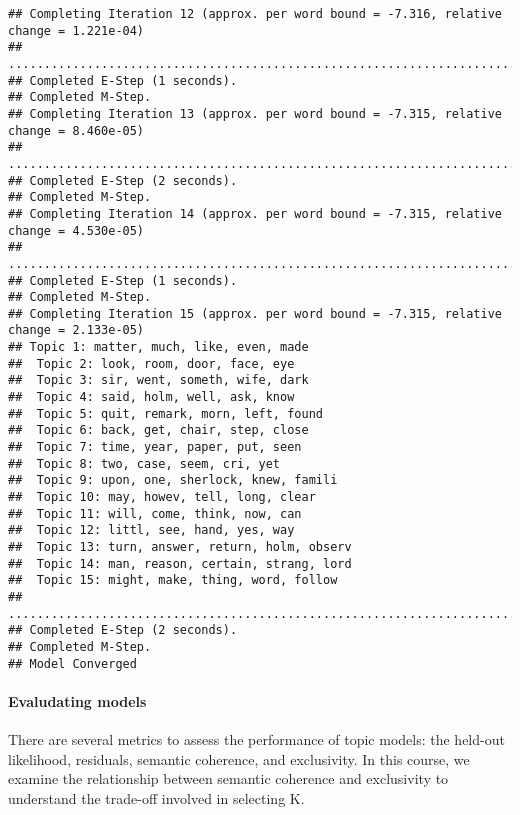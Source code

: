 \documentclass[
]{book}
\begin{document}
\begin{verbatim}
## Completing Iteration 12 (approx. per word bound = -7.316, relative change = 1.221e-04) 
## ....................................................................................................
## Completed E-Step (1 seconds). 
## Completed M-Step. 
## Completing Iteration 13 (approx. per word bound = -7.315, relative change = 8.460e-05) 
## ....................................................................................................
## Completed E-Step (2 seconds). 
## Completed M-Step. 
## Completing Iteration 14 (approx. per word bound = -7.315, relative change = 4.530e-05) 
## ....................................................................................................
## Completed E-Step (1 seconds). 
## Completed M-Step. 
## Completing Iteration 15 (approx. per word bound = -7.315, relative change = 2.133e-05) 
## Topic 1: matter, much, like, even, made 
##  Topic 2: look, room, door, face, eye 
##  Topic 3: sir, went, someth, wife, dark 
##  Topic 4: said, holm, well, ask, know 
##  Topic 5: quit, remark, morn, left, found 
##  Topic 6: back, get, chair, step, close 
##  Topic 7: time, year, paper, put, seen 
##  Topic 8: two, case, seem, cri, yet 
##  Topic 9: upon, one, sherlock, knew, famili 
##  Topic 10: may, howev, tell, long, clear 
##  Topic 11: will, come, think, now, can 
##  Topic 12: littl, see, hand, yes, way 
##  Topic 13: turn, answer, return, holm, observ 
##  Topic 14: man, reason, certain, strang, lord 
##  Topic 15: might, make, thing, word, follow 
## ....................................................................................................
## Completed E-Step (2 seconds). 
## Completed M-Step. 
## Model Converged
\end{verbatim}

\hypertarget{evaludating-models}{%
\paragraph{Evaludating models}\label{evaludating-models}}

There are several metrics to assess the performance of topic models: the held-out likelihood, residuals, semantic coherence, and exclusivity. In this course, we examine the relationship between semantic coherence and exclusivity to understand the trade-off involved in selecting K.
\end{document}
